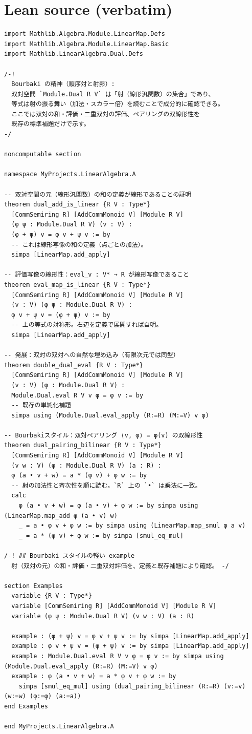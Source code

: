 \documentclass[12pt]{article}
\begin{document}
\section*{Lean source (verbatim)}
\begin{lstlisting}
import Mathlib.Algebra.Module.LinearMap.Defs
import Mathlib.Algebra.Module.LinearMap.Basic
import Mathlib.LinearAlgebra.Dual.Defs

/-!
  Bourbaki の精神（順序対と射影）:
  双対空間 `Module.Dual R V` は「射（線形汎関数）の集合」であり、
  等式は射の振る舞い（加法・スカラー倍）を読むことで成分的に確認できる。
  ここでは双対の和・評価・二重双対の評価、ペアリングの双線形性を
  既存の標準補題だけで示す。
-/

noncomputable section

namespace MyProjects.LinearAlgebra.A

-- 双対空間の元（線形汎関数）の和の定義が線形であることの証明
theorem dual_add_is_linear {R V : Type*}
  [CommSemiring R] [AddCommMonoid V] [Module R V]
  (φ ψ : Module.Dual R V) (v : V) :
  (φ + ψ) v = φ v + ψ v := by
  -- これは線形写像の和の定義（点ごとの加法）。
  simpa [LinearMap.add_apply]

-- 評価写像の線形性：eval_v : V* → R が線形写像であること
theorem eval_map_is_linear {R V : Type*}
  [CommSemiring R] [AddCommMonoid V] [Module R V]
  (v : V) (φ ψ : Module.Dual R V) :
  φ v + ψ v = (φ + ψ) v := by
  -- 上の等式の対称形。右辺を定義で展開すれば自明。
  simpa [LinearMap.add_apply]

-- 発展：双対の双対への自然な埋め込み（有限次元では同型）
theorem double_dual_eval {R V : Type*}
  [CommSemiring R] [AddCommMonoid V] [Module R V]
  (v : V) (φ : Module.Dual R V) :
  Module.Dual.eval R V v φ = φ v := by
  -- 既存の単純化補題
  simpa using (Module.Dual.eval_apply (R:=R) (M:=V) v φ)

-- Bourbakiスタイル：双対ペアリング ⟨v, φ⟩ = φ(v) の双線形性
theorem dual_pairing_bilinear {R V : Type*}
  [CommSemiring R] [AddCommMonoid V] [Module R V]
  (v w : V) (φ : Module.Dual R V) (a : R) :
  φ (a • v + w) = a * (φ v) + φ w := by
  -- 射の加法性と斉次性を順に読む。`R` 上の `•` は乗法に一致。
  calc
    φ (a • v + w) = φ (a • v) + φ w := by simpa using (LinearMap.map_add φ (a • v) w)
    _ = a • φ v + φ w := by simpa using (LinearMap.map_smul φ a v)
    _ = a * (φ v) + φ w := by simpa [smul_eq_mul]

/-! ## Bourbaki スタイルの軽い example
  射（双対の元）の和・評価・二重双対評価を、定義と既存補題により確認。 -/

section Examples
  variable {R V : Type*}
  variable [CommSemiring R] [AddCommMonoid V] [Module R V]
  variable (φ ψ : Module.Dual R V) (v w : V) (a : R)

  example : (φ + ψ) v = φ v + ψ v := by simpa [LinearMap.add_apply]
  example : φ v + ψ v = (φ + ψ) v := by simpa [LinearMap.add_apply]
  example : Module.Dual.eval R V v φ = φ v := by simpa using (Module.Dual.eval_apply (R:=R) (M:=V) v φ)
  example : φ (a • v + w) = a * φ v + φ w := by
    simpa [smul_eq_mul] using (dual_pairing_bilinear (R:=R) (v:=v) (w:=w) (φ:=φ) (a:=a))
end Examples

end MyProjects.LinearAlgebra.A

\end{lstlisting}
\end{document}
